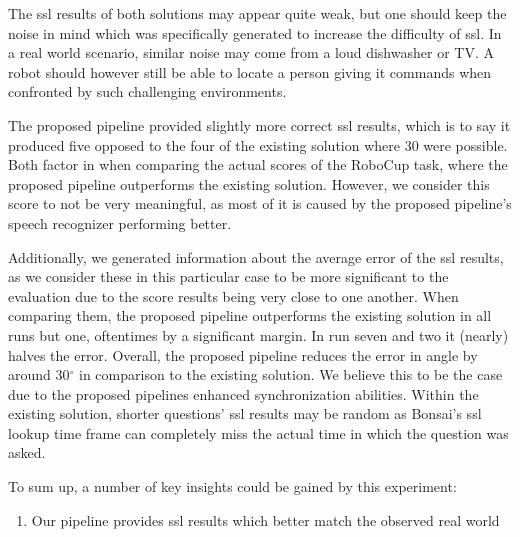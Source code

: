 The \gls{ssl} results of both solutions may appear quite weak, but one should keep the noise in mind which was specifically generated to increase the difficulty of \gls{ssl}.
In a real world scenario, similar noise may come from a loud dishwasher or TV.
A robot should however still be able to locate a person giving it commands when confronted by such challenging environments.

The proposed pipeline provided slightly more correct \gls{ssl} results, which is to say it produced five opposed to the four of the existing solution where 30 were possible.
Both factor in when comparing the actual scores of the RoboCup task, where the proposed pipeline outperforms the existing solution.
However, we consider this score to not be very meaningful, as most of it is caused by the proposed pipeline's speech recognizer performing better.

Additionally, we generated information about the average error of the \gls{ssl} results, as we consider these in this particular case to be more significant to the evaluation due to the score results being very close to one another.
When comparing them, the proposed pipeline outperforms the existing solution in all runs but one, oftentimes by a significant margin.
In run seven and two it (nearly) halves the error.
Overall, the proposed pipeline reduces the error in angle by around 30$^\circ$ in comparison to the existing solution.
We believe this to be the case due to the proposed pipelines enhanced synchronization abilities.
Within the existing solution, shorter questions' \gls{ssl} results may be random as Bonsai's \gls{ssl} lookup time frame can completely miss the actual time in which the question was asked.

To sum up, a number of key insights could be gained by this experiment:

\begin{enumerate}
	\item Our pipeline provides \gls{ssl} results which better match the observed real world 
\end{enumerate}














